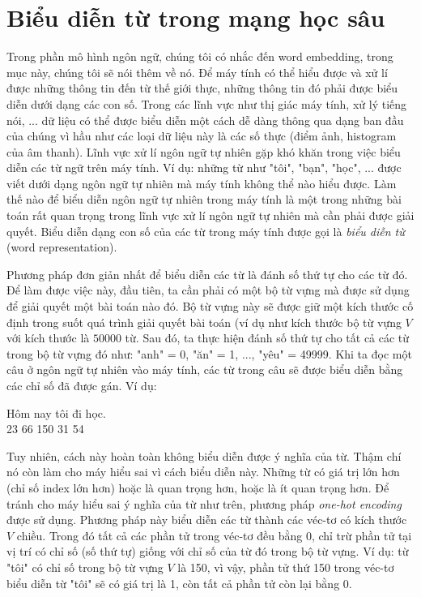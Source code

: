 \section{Biểu diễn từ trong mạng học sâu} \label{wordembeddingsection}
Trong phần mô hình ngôn ngữ, chúng tôi có nhắc đến word embedding, trong mục này, chúng tôi sẽ nói thêm về nó. Để máy tính có thể hiểu được và xử lí được những thông tin đến từ thế giới thực, những thông tin đó phải được biểu diễn dưới dạng các con số. Trong các lĩnh vực như thị giác máy tính, xử lý tiếng nói, ... dữ liệu có thể được biểu diễn một cách dễ dàng thông qua dạng ban đầu của chúng vì hầu như các loại dữ liệu này là các số thực (điểm ảnh, histogram của âm thanh). Lĩnh vực xử lí ngôn ngữ tự nhiên gặp khó khăn trong việc biểu diễn các từ ngữ trên máy tính. Ví dụ: những từ như "tôi", "bạn", "học", ... được viết dưới dạng ngôn ngữ tự nhiên mà máy tính không thể nào hiểu được. Làm thế nào để biểu diễn ngôn ngữ tự nhiên trong máy tính là một trong những bài toán rất quan trọng trong lĩnh vực xử lí ngôn ngữ tự nhiên mà cần phải được giải quyết. Biểu diễn dạng con số của các từ trong máy tính được gọi là \textit{biểu diễn từ} (word representation).

Phương pháp đơn giản nhất để biểu diễn các từ là đánh số thứ tự cho các từ đó. Để làm được việc này, đầu tiên, ta cần phải có một bộ từ vựng mà được sử dụng để giải quyết một bài toán nào đó. Bộ từ vựng này sẽ được giữ một kích thước cố định trong suốt quá trình giải quyết bài toán (ví dụ như kích thước bộ từ vựng $V$ với kích thước là $50000$ từ. Sau đó, ta thực hiện đánh số thứ tự cho tất cả các từ trong bộ từ vựng đó như: "anh" = 0, "ăn" = 1, ..., "yêu" = 49999. Khi ta đọc một câu ở ngôn ngữ tự nhiên vào máy tính, các từ trong câu sẽ được biểu diễn bằng các chỉ số đã được gán. Ví dụ:
\begin{center}
	Hôm nay tôi đi học. \\
	23  66  150 31 54
\end{center}

Tuy nhiên, cách này hoàn toàn không biểu diễn được ý nghĩa của từ. Thậm chí nó còn làm cho máy hiểu sai vì cách biểu diễn này. Những từ có giá trị lớn hơn (chỉ số index lớn hơn) hoặc là quan trọng hơn, hoặc là ít quan trọng hơn. Để tránh cho máy hiểu sai ý nghĩa của từ như trên, phương pháp \textit{one-hot encoding} được sử dụng. Phương pháp này biểu diễn các từ thành các véc-tơ có kích thước $V$ chiều. Trong đó tất cả các phần tử trong véc-tơ đều bằng 0, chỉ trừ phần tử tại vị trí có chỉ số (số thứ tự) giống với chỉ số của từ đó trong bộ từ vựng. Ví dụ: từ "tôi" có chỉ số trong bộ từ vựng $V$ là 150, vì vậy, phần tử thứ 150 trong véc-tơ biểu diễn từ "tôi" sẽ có giá trị là 1, còn tất cả phần tử còn lại bằng 0.

